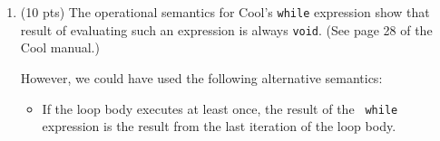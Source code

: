 \documentclass[10pt]{article}
\newcommand{\ossimple}[6]{#1,#2,#3\vdash #4 : #5,#6}
\newcommand{\osrule}[8]{\frac{#7}{\ossimple{#1}{#2}{#3}{#4}{#5}{#6}}\eqno
  \mbox{#8}}
\begin{document}
\begin{enumerate}
Write the operational semantics for these three syntactic constructs. You
may find it helpful to think of an array of type $T[n]$ as an object with
$n$ attributes of type $T$.
$$
\osrule{so}{S_1}{E_1}{\mbox{let } a:T[e_1] \mbox{ in } e_2}{v_2}{S_{4}}
	{\begin{array}{l}
	\ossimple{so}{S_1}{E_1}{e_1}{\mbox{Int}(n)}{S_2}\\
	l_i = \mbox{newloc}(S_2) \mbox{ for } i = 0 \dots n \mbox{ and each } l_i \mbox{ is distinct }\\
	v_a = \mbox{array}(a_1:l_1, \dots, a_n:l_n)\\
	S_3 = S_2[v_a/l_0, D_T/l_1, \dots, D_T/l_n]\\
	E_2 = E_1[l_0/a]\\
	\ossimple{so}{S_3}{E_2}{e_2}{v_2}{S_4}
	 \end{array}}{}
$$

$$
\osrule{so}{S_1}{E}{a[e_1] \mbox{\texttt{ <- }} e_2}{v_2}{S_{4}}
	{\begin{array}{l}
	\ossimple{so}{S_1}{E}{e_1}{\mbox{Int}(m)}{S_2}\\
	\ossimple{so}{S_2}{E}{e_2}{v_2}{S_3}\\
	E(a) = l_a\\
	S_2(l_a) = \mbox{array}(a_1:l_1, \dots, a_n:l_n)\\
	1 \le m \le n\\
	S_4 = S_3[v_2/l_m]
	 \end{array}}{}
$$

$$
\osrule{so}{S_1}{E}{a[e]}{v}{S_2}
	{\begin{array}{l}
	\ossimple{so}{S_1}{E}{e_1}{\mbox{Int}(m)}{S_2}\\
	E(a) = l_a\\
	S_2(l_a) = \mbox{array}(a_1:l_1, \dots, a_n:l_n)\\
	1 \le m \le n\\
	v = S_2(l_m)
	 \end{array}}{}
$$
\pagebreak

\item (10 pts)
The operational semantics for Cool's {\tt while} expression show that
result of evaluating such an expression is always {\tt void}.  (See page
28 of the Cool manual.)

However, we could have used the following alternative semantics:

\begin{itemize}

\item If the loop body executes at least once, the result of the {\tt
while} expression is the result from the last iteration of the loop body.


\end{itemize}
\end{enumerate}
\end{document}

